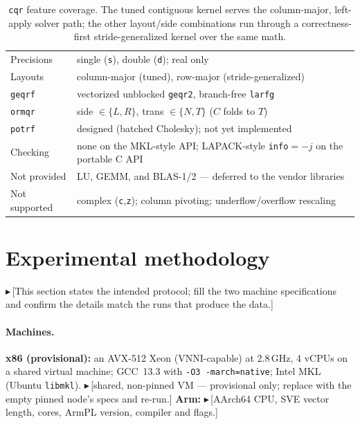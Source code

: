 \documentclass[11pt]{article}
\newif\ifdraftmode \draftmodetrue
\newcommand{\draftnote}[1]{\ifdraftmode{\textcolor{orange!85!black}{\small$\blacktriangleright$\,\textsf{[#1]}}}\fi}
\newcommand{\code}[1]{\texttt{#1}}
\newcommand{\cqr}{\mbox{\texttt{cqr}}}
\begin{document}
\begin{table}[t]
\centering
\caption{\cqr{} feature coverage. The tuned contiguous kernel serves the
column-major, left-apply solver path; the other layout/side combinations run
through a correctness-first stride-generalized kernel over the same math.}
\label{tab:coverage}
\small
\begin{tabularx}{\linewidth}{@{}l X@{}}
\toprule
Precisions        & single (\code{s}), double (\code{d}); real only \\
Layouts           & column-major (tuned), row-major (stride-generalized) \\
\code{geqrf}      & vectorized unblocked \code{geqr2}, branch-free \code{larfg} \\
\code{ormqr}      & side $\in\{L,R\}$, trans $\in\{N,T\}$ ($C$ folds to $T$) \\
\code{potrf}      & designed (batched Cholesky); not yet implemented \\
Checking          & none on the MKL-style API; LAPACK-style \code{info}$=-j$ on the portable C API \\
Not provided      & LU, GEMM, and BLAS-1/2 --- deferred to the vendor libraries \\
Not supported     & complex (\code{c},\code{z}); column pivoting; underflow/overflow rescaling \\
\bottomrule
\end{tabularx}
\end{table}

\section{Experimental methodology}
\label{sec:method}

\draftnote{This section states the intended protocol; fill the two machine
specifications and confirm the details match the runs that produce the data.}

\paragraph{Machines.}
\textbf{x86 (provisional):} an AVX-512 Xeon (VNNI-capable) at 2.8\,GHz, 4 vCPUs
on a shared virtual machine; GCC~13.3 with \code{-O3 -march=native}; Intel MKL
(Ubuntu \code{libmkl}). \draftnote{shared, non-pinned VM --- provisional only;
replace with the empty pinned node's specs and re-run.}
\textbf{Arm:} \draftnote{AArch64 CPU, SVE vector length, cores, ArmPL version,
compiler and flags.}
\end{document}
